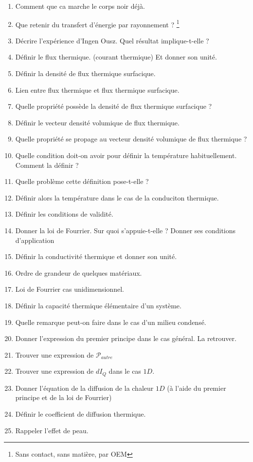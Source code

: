 \documentclass[a4paper, 11pt, hidelinks]{article}
\begin{document}
\begin{enumerate}
    \item Comment que ca marche le corps noir déjà. \cite{Chapitre20}
    \item Que retenir du transfert d'énergie par rayonnement ? \footnote{Sans contact, sans matière, par OEM} \cite{Chapitre20}
    \item Décrire l'expérience d'Ingen Ousz. Quel résultat implique-t-elle ? \cite{Chapitre20} 
    \item Définir le flux thermique. (courant thermique) Et donner son unité. \cite{Chapitre20}
    \item Définir la densité de flux thermique surfacique. \cite{Chapitre20}
    \item Lien entre flux thermique et flux thermique surfacique. \cite{Chapitre20}
    \item Quelle propriété possède la densité de flux thermique surfacique ? \cite{Chapitre20}
    \item Définir le vecteur densité volumique de flux thermique. \cite{Chapitre20}
    \item Quelle propriété se propage au vecteur densité volumique de flux thermique ? \cite{Chapitre20}
    \item Quelle condition doit-on avoir pour définir la température habituellement. Comment la définir ? \cite{Chapitre20}
    \item Quelle problème cette définition pose-t-elle ? \cite{Chapitre20}
    \item Définir alors la température dans le cas de la conduciton thermique. \cite{Chapitre20}
    \item Définir les conditions de validité. \cite{Chapitre20}
    \item Donner la loi de Fourrier. Sur quoi s'appuie-t-elle ? Donner ses conditions d'application \cite{Chapitre20}
    \item Définir la conductivité thermique et donner son unité. \cite{Chapitre20}
    \item Ordre de grandeur de quelques matériaux. \cite{Chapitre20}
    \item Loi de Fourrier cas unidimensionnel. \cite{Chapitre20}
    \item Définir la capacité thermique élémentaire d'un système. \cite{Chapitre20}
    \item Quelle remarque peut-on faire dans le cas d'un milieu condensé. \cite{Chapitre20}
    \item Donner l'expression du premier principe dans le cas général. La retrouver. \cite{Chapitre20}
    \item Trouver une expression de $\mathscr{P}_{autre}$ \cite{Chapitre20}
    \item Trouver une expression de $dI_Q$ dans le cas $1D$. \cite{Chapitre20}
    \item Donner l'équation de la diffusion de la chaleur $1D$ (à l'aide du premier principe et de la loi de Fourrier) \cite{Chapitre20}
    \item Définir le coefficient de diffusion thermique. \cite{Chapitre20}
    \item Rappeler l'effet de peau. \cite{Chapitre20}
\end{enumerate}






\end{document}
